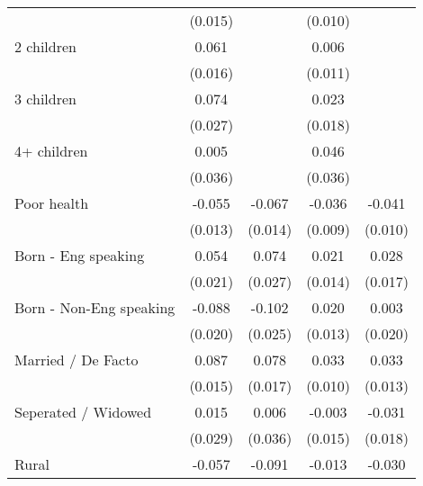 {\begin{tabular}{l*{4}{c}}
                    &     (0.015)         &                     &     (0.010)         &                     \\
2 children          &       0.061\sym{***}&                     &       0.006         &                     \\
                    &     (0.016)         &                     &     (0.011)         &                     \\
3 children          &       0.074\sym{***}&                     &       0.023         &                     \\
                    &     (0.027)         &                     &     (0.018)         &                     \\
4+ children         &       0.005         &                     &       0.046         &                     \\
                    &     (0.036)         &                     &     (0.036)         &                     \\
Poor health         &      -0.055\sym{***}&      -0.067\sym{***}&      -0.036\sym{***}&      -0.041\sym{***}\\
                    &     (0.013)         &     (0.014)         &     (0.009)         &     (0.010)         \\
Born - Eng speaking &       0.054\sym{***}&       0.074\sym{***}&       0.021         &       0.028\sym{*}  \\
                    &     (0.021)         &     (0.027)         &     (0.014)         &     (0.017)         \\
Born - Non-Eng speaking&      -0.088\sym{***}&      -0.102\sym{***}&       0.020         &       0.003         \\
                    &     (0.020)         &     (0.025)         &     (0.013)         &     (0.020)         \\
Married / De Facto  &       0.087\sym{***}&       0.078\sym{***}&       0.033\sym{***}&       0.033\sym{**} \\
                    &     (0.015)         &     (0.017)         &     (0.010)         &     (0.013)         \\
Seperated / Widowed &       0.015         &       0.006         &      -0.003         &      -0.031\sym{*}  \\
                    &     (0.029)         &     (0.036)         &     (0.015)         &     (0.018)         \\
Rural               &      -0.057\sym{***}&      -0.091\sym{***}&      -0.013         &      -0.030\sym{**} \\

\end{tabular}}
